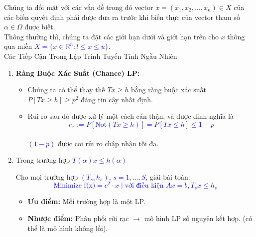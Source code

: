 \documentclass[a4paper]{article}
\begin{document}
Chúng ta đối mặt với các vấn đề trong đó vector \(x = (x_1, x_2, \ldots, x_n) \in X\) của các biến quyết định phải được đưa ra trước khi biến thực của vector tham số \(\alpha \in \Omega\) được biết.\\

\quad Thông thường thì, chúng ta đặt các giới hạn dưới và giới hạn trên cho \(x\) thông qua miền \textcolor{blue}{\(X = \{x \in \mathbb{R}^n : l \leq x \leq u\}\)}.\\

Các Tiếp Cận Trong Lập Trình Tuyến Tính Ngẫu Nhiên

\begin{enumerate}
    \item \textbf{Ràng Buộc Xác Suất (Chance) LP:}
    \begin{itemize}
          \item Chúng ta có thể thay thế $T x \geq h$ bằng ràng buộc xác suất $P[T x \geq h] \geq p^2$ đáng tin cậy nhất định. 
          \item Rủi ro sau đó được xử lý một cách cẩn thận, và được định nghĩa là 
          \textcolor{blue}{$$r_x := P[\text{Not} (T x \geq h)] = P[T x \leq h] \leq 1 - p$$}\\
          \textcolor{blue}{$(1 - p)$} được coi rủi ro chập nhận tối đa.
    
    \end{itemize}
\item Trong trường hợp \textcolor{blue}{$T(\alpha) x \leq h(\alpha)$ }

\quad Cho mọi trường hợp \textcolor{blue}{$(T_s, h_s)$, $s = 1, \ldots, S$}, giải bài toán:
\textit{\textcolor{blue}{$$\text{Minimize f(x)} = c^T \cdot x \mid \text{với điều kiện } A x = b, T_s x \leq h_s$$ }} 
\begin{itemize}
\item \textbf{Ưu điểm:} Mỗi trường hợp là một LP. 
\item \textbf{Nhược điểm:} Phân phối rời rạc $\rightarrow$ mô hình LP số nguyên kết hợp. (có thể là mô hình không lồi).
\end{itemize}
\end{enumerate}
\end{document}
